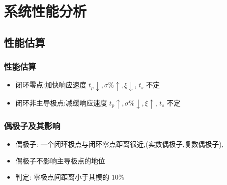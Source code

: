 \documentclass{article}
\begin{document}
\section{系统性能分析}
\label{sec-4}
\subsection{性能估算}
\label{sec-4-1}
\begin{frame}
\frametitle{性能估算}
\label{sec-4-1-1}

\begin{itemize}
\item <2->闭环零点:加快响应速度 $t_{p}\downarrow,\sigma\%\uparrow,\xi\downarrow$, $t_s$ 不定
\item <3->闭环非主导极点:减缓响应速度 $t_{p}\uparrow,\sigma\%\downarrow,\xi\uparrow$, $t_s$ 不定
\end{itemize}
\end{frame}
\begin{frame}
\frametitle{偶极子及其影响}
\label{sec-4-1-2}


\begin{itemize}
\item <2->偶极子: 一个闭环极点与闭环零点距离很近,(实数偶极子,复数偶极子),
\item <3->偶极子不影响主导极点的地位
\item <4->判定: 零极点间距离小于其模的 $10\%$
\end{itemize}
\end{frame}
\end{document}
